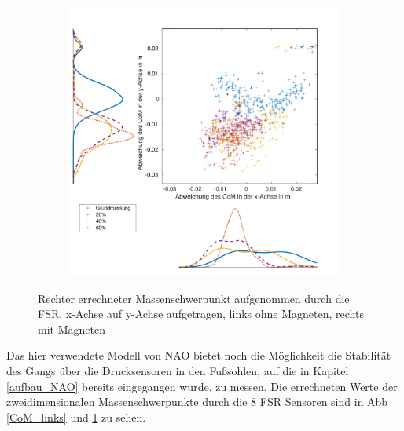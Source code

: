 \begin{figure}[tb]
\begin{adjustwidth}{-0.2\linewidth}{-0.2\linewidth}
\begin{subfigure}[c]{.45\linewidth}
			\includegraphics[width=\linewidth]{Bilder/rechts_CoM_mitM.pdf}
			\vspace{5pt}
		\end{subfigure}
	\end{adjustwidth}
	\caption{Rechter errechneter Massenschwerpunkt aufgenommen durch die FSR, x-Achse auf y-Achse aufgetragen, links ohne Magneten, rechts mit Magneten} \label{CoM_rechts}
\end{figure}
Das hier verwendete Modell von NAO bietet noch die Möglichkeit die Stabilität des Gangs über die Drucksensoren in den Fußsohlen, auf die in Kapitel \ref{aufbau_NAO} bereits eingegangen wurde, zu messen. Die errechneten Werte der zweidimensionalen Massenschwerpunkte durch die 8 FSR Sensoren sind in Abb \ref{CoM_links} und \ref{CoM_rechts} zu sehen.



